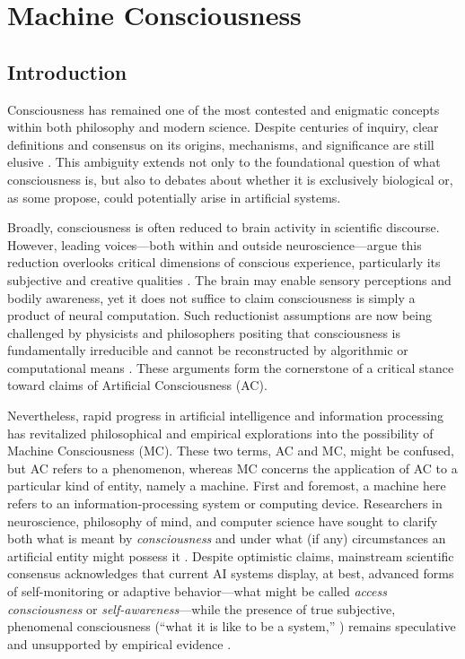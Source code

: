 \chapter{Machine Consciousness}

\section{Introduction}

Consciousness has remained one of the most contested and enigmatic concepts within both philosophy and modern science. Despite centuries of inquiry, clear definitions and consensus on its origins, mechanisms, and significance are still elusive \cite{francken2022consciousness,reggia2013rise}. This ambiguity extends not only to the foundational question of what consciousness is, but also to debates about whether it is exclusively biological or, as some propose, could potentially arise in artificial systems.

Broadly, consciousness is often reduced to brain activity in scientific discourse. However, leading voices---both within and outside neuroscience---argue this reduction overlooks critical dimensions of conscious experience, particularly its subjective and creative qualities \cite{garridomerchan2024machine}. The brain may enable sensory perceptions and bodily awareness, yet it does not suffice to claim consciousness is simply a product of neural computation. Such reductionist assumptions are now being challenged by physicists and philosophers positing that consciousness is fundamentally irreducible and cannot be reconstructed by algorithmic or computational means \cite{faggin2024irreducible,penrose1990emperors}. These arguments form the cornerstone of a critical stance toward claims of Artificial Consciousness (AC).

Nevertheless, rapid progress in artificial intelligence and information processing has revitalized philosophical and empirical explorations into the possibility of Machine Consciousness (MC). These two terms, AC and MC, might be confused, but AC refers to a phenomenon, whereas MC concerns the application of AC to a particular kind of entity, namely a machine. First and foremost, a machine here refers to an information-processing system or computing device. Researchers in neuroscience, philosophy of mind, and computer science have sought to clarify both what is meant by \emph{consciousness} and under what (if any) circumstances an artificial entity might possess it \cite{butlin2023consciousness}. Despite optimistic claims, mainstream scientific consensus acknowledges that current AI systems display, at best, advanced forms of self-monitoring or adaptive behavior---what might be called \emph{access consciousness} or \emph{self-awareness}---while the presence of true subjective, phenomenal consciousness (``what it is like to be a system,'' \cite{nagel1974like}) remains speculative and unsupported by empirical evidence \cite{francken2022consciousness,garridomerchan2024machine,reggia2013rise}.

